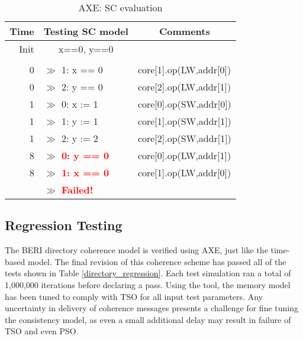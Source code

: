 		\captionsetup[table]{name=Trace}
		\begin{table}[!t]
		\begin{center}
		\selectfont
		\begin{tabular}{|r|l|l|}
			\hline
			\textbf{Time} & \textbf{Testing SC model} & \multicolumn{1}{c|}{\textbf{Comments}} \\
			\hline 
			Init & \multicolumn{1}{c|}{x==0, y==0} & \\
			& & \\
			0 & $\gg$ 1: x == 0 & core[1].op(LW,addr[0]) \\
			0 & $\gg$ 2: y == 0 & core[2].op(LW,addr[1]) \\
			1 & $\gg$ 0: x := 1 & core[0].op(SW,addr[0]) \\
			1 & $\gg$ 1: y := 1 & core[1].op(SW,addr[1]) \\
			1 & $\gg$ 2: y := 2 & core[2].op(SW,addr[1]) \\
			8 & $\gg$ \textbf{\textcolor{Red}{0: y == 0}} & core[0].op(LW,addr[1]) \\
			8 & $\gg$ \textbf{\textcolor{Red}{1: x == 0}} & core[1].op(LW,addr[0]) \\
			& $\gg$ \textbf{\textcolor{Red}{Failed!}} & \\
			\hline
		\end{tabular}
		\caption{AXE: SC evaluation}
		\label{directory_sc_test_mem}
		\end{center} 
		\end{table}
		\captionsetup[table]{name=Table}

					\begin{comment}
					setAddrMap(<17, 12, 11,  5>)
					chooseVars(<V 0xb 0xf 0x4 0x2  >)
					2065: core[1].op(LW,'h0)
					2065: core[2].op(LW,'h2)
					2066: core[0].op(SW,'h0)
					2066: core[1].op(SW,'h2)
					2066: core[2].op(SW,'h2)
					2069: core[0].op(LW,'h2)
					2069: core[1].op(LW,'h0)
					1: v11 == 0 %
					2: v4 == 0 %
					0: v11 := 16 %
					1: v4 := 9 %
					2: v4 := 10 %
					0: v4 == 0 %
					1: v11 == 0 %
					Failed!
					\end{comment}

	
	\subsection{Regression Testing}
		The BERI directory coherence model is verified using AXE, just like the time-based model. The final revision of this coherence scheme has passed all of the tests shown in Table \ref{directory_regression}. Each test simulation ran a total of 1,000,000 iterations before declaring a pass. Using the tool, the memory model has been tuned to comply with TSO for all input test parameters. Any uncertainty in delivery of coherence messages presents a challenge for fine tuning the consistency model, as even a small additional delay may result in failure of TSO and even PSO.
		
